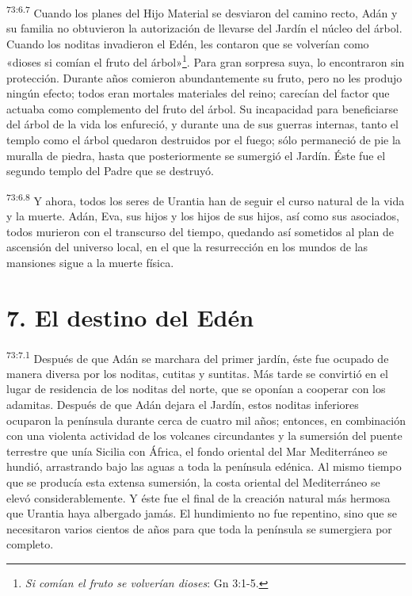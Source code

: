 \par
\textsuperscript{73:6.7} Cuando los planes del Hijo Material se desviaron del camino recto, Adán y su familia no obtuvieron la autorización de llevarse del Jardín el núcleo del árbol. Cuando los noditas invadieron el Edén, les contaron que se volverían como «dioses si comían el fruto del árbol»\footnote{\textit{Si comían el fruto se volverían dioses}: Gn 3:1-5.}. Para gran sorpresa suya, lo encontraron sin protección. Durante años comieron abundantemente su fruto, pero no les produjo ningún efecto; todos eran mortales materiales del reino; carecían del factor que actuaba como complemento del fruto del árbol. Su incapacidad para beneficiarse del árbol de la vida los enfureció, y durante una de sus guerras internas, tanto el templo como el árbol quedaron destruidos por el fuego; sólo permaneció de pie la muralla de piedra, hasta que posteriormente se sumergió el Jardín. Éste fue el segundo templo del Padre que se destruyó.

\par
\textsuperscript{73:6.8} Y ahora, todos los seres de Urantia han de seguir el curso natural de la vida y la muerte. Adán, Eva, sus hijos y los hijos de sus hijos, así como sus asociados, todos murieron con el transcurso del tiempo, quedando así sometidos al plan de ascensión del universo local, en el que la resurrección en los mundos de las mansiones sigue a la muerte física.

\section*{7. El destino del Edén}
\par
\textsuperscript{73:7.1} Después de que Adán se marchara del primer jardín, éste fue ocupado de manera diversa por los noditas, cutitas y suntitas. Más tarde se convirtió en el lugar de residencia de los noditas del norte, que se oponían a cooperar con los adamitas. Después de que Adán dejara el Jardín, estos noditas inferiores ocuparon la península durante cerca de cuatro mil años; entonces, en combinación con una violenta actividad de los volcanes circundantes y la sumersión del puente terrestre que unía Sicilia con África, el fondo oriental del Mar Mediterráneo se hundió, arrastrando bajo las aguas a toda la península edénica. Al mismo tiempo que se producía esta extensa sumersión, la costa oriental del Mediterráneo se elevó considerablemente. Y éste fue el final de la creación natural más hermosa que Urantia haya albergado jamás. El hundimiento no fue repentino, sino que se necesitaron varios cientos de años para que toda la península se sumergiera por completo.

